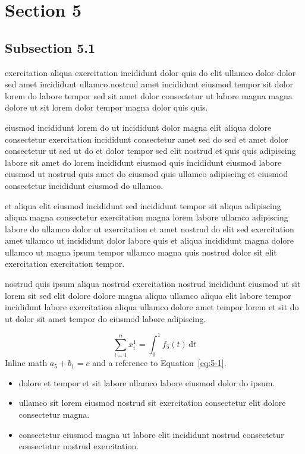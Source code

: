 \documentclass{article}
\begin{document}
\section{Section 5}\label{sec:5}
\subsection{Subsection 5.1}\label{sec:5-1}
exercitation aliqua exercitation incididunt dolor quis do elit ullamco dolor dolor sed amet incididunt ullamco nostrud amet incididunt eiusmod tempor sit dolor lorem do labore tempor sed sit amet dolor consectetur ut labore magna magna dolore ut sit lorem dolor tempor magna dolor quis quis.

eiusmod incididunt lorem do ut incididunt dolor magna elit aliqua dolore consectetur exercitation incididunt consectetur amet sed do sed et amet dolor consectetur ut sed ut do et dolor tempor sed elit nostrud et quis quis adipiscing labore sit amet do lorem incididunt eiusmod quis incididunt eiusmod labore eiusmod ut nostrud quis amet do eiusmod quis ullamco adipiscing et eiusmod consectetur incididunt eiusmod do ullamco.

et aliqua elit eiusmod incididunt sed incididunt tempor sit aliqua adipiscing aliqua magna consectetur exercitation magna lorem labore ullamco adipiscing labore do ullamco dolor ut exercitation et amet nostrud do elit sed exercitation amet ullamco ut incididunt dolor labore quis et aliqua incididunt magna dolore ullamco ut magna ipsum tempor ullamco magna quis nostrud dolor sit elit exercitation exercitation tempor.

nostrud quis ipsum aliqua nostrud exercitation nostrud incididunt eiusmod ut sit lorem sit sed elit dolore dolore magna aliqua ullamco aliqua elit labore tempor incididunt labore exercitation aliqua ullamco dolore amet tempor lorem et sit do ut dolor sit amet tempor do eiusmod labore adipiscing.

\begin{equation}\label{eq:5-1}
  \sum_{i=1}^{n} x_i^{1} = \int_0^1 f_{5}(t)\,\mathrm{d}t
\end{equation}
Inline math $a_{5} + b_{1} = c$ and a reference to Equation~\eqref{eq:5-1}.

\begin{itemize}
  \item dolore et tempor et sit labore ullamco labore eiusmod dolor do ipsum.
  \item ullamco sit lorem eiusmod nostrud sit exercitation consectetur elit dolore consectetur magna.
  \item consectetur eiusmod magna ut labore elit incididunt nostrud consectetur consectetur nostrud exercitation.
\end{itemize}
\end{document}
